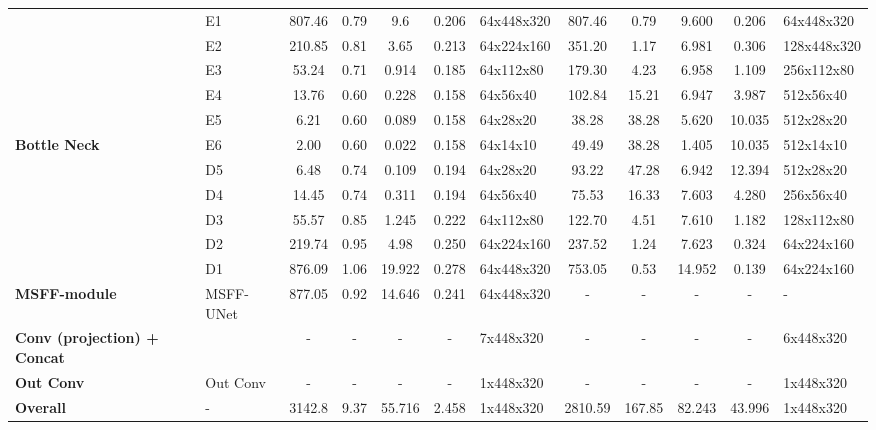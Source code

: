 \begin{table}[ht]
{\begin{tabular}{llcccclccccl}
 & E1 & 807.46 & 0.79 & 9.6 & 0.206&64x448x320 & 807.46 & 0.79 & 9.600 & 0.206 &64x448x320\\ 
& E2 & 210.85 & 0.81 & 3.65 & 0.213&64x224x160 & 351.20 & 1.17 & 6.981 & 0.306 &128x448x320\\ 
& E3 & 53.24 & 0.71 & 0.914 & 0.185&64x112x80 & 179.30 & 4.23 & 6.958 & 1.109 &256x112x80\\ 
& E4 & 13.76 & 0.60 & 0.228 & 0.158&64x56x40 & 102.84 & 15.21 & 6.947 & 3.987 &512x56x40\\
& E5 & 6.21 & 0.60 & 0.089 & 0.158&64x28x20 & 38.28 & 38.28 & 5.620 & 10.035 &512x28x20\\ \hline
\textbf{Bottle Neck} & E6 & 2.00 & 0.60 & 0.022 & 0.158&64x14x10 & 49.49 & 38.28 & 1.405 & 10.035&512x14x10 \\ \hline
{}        
& D5 & 6.48 & 0.74 & 0.109 & 0.194&64x28x20 & 93.22 & 47.28 & 6.942 & 12.394 &512x28x20\\ 
& D4 & 14.45 & 0.74 & 0.311 & 0.194&64x56x40 & 75.53 & 16.33 & 7.603 & 4.280 &256x56x40\\ 
& D3 & 55.57 & 0.85 & 1.245 & 0.222&64x112x80 & 122.70 & 4.51 & 7.610 & 1.182 &128x112x80\\ 
& D2 & 219.74 & 0.95 & 4.98 & 0.250&64x224x160 & 237.52 & 1.24 & 7.623 & 0.324 &64x224x160\\ 
& D1 & 876.09 & 1.06 & 19.922 & 0.278&64x448x320 & 753.05 & 0.53 & 14.952 & 0.139&64x224x160 \\ \hline

\textbf{MSFF-module} & MSFF-UNet & 877.05 & 0.92 & 14.646 & 0.241&64x448x320 & - & - & - & -&-\\ \hline
\textbf{Conv (projection) + Concat} & &-&-&-&-&7x448x320 &-&-&-&-&6x448x320\\ \hline

\textbf{Out Conv} &Out Conv &-&-&-&-&1x448x320 &-&-&-&-&1x448x320\\ \hline

\textbf{Overall} & - & 3142.8 & 9.37 & 55.716 & 2.458&1x448x320 & 2810.59 & 167.85 & 82.243 & 43.996 &1x448x320\\ \hline
\end{tabular}}
\label{tab:mnsnet_u2net_comparison}
\end{table}

